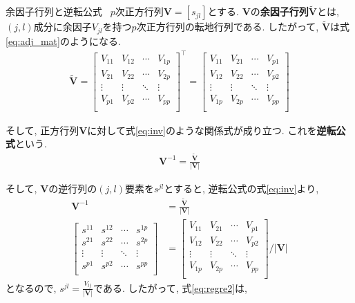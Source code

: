 \begin{itembox}[l]{余因子行列と逆転公式}
  \ $p$次正方行列$\bm{V}=[s_{jl}]$とする. $\bm{V}$の{\bf 余因子行列}$\tilde{\bm{V}}$とは, $(j, l)$成分に余因子$V_{jl}$を持つ$p$次正方行列の転地行列である. したがって, $\tilde{\bm{V}}$は式\eqref{eq:adj_mat}のようになる. 
  \begin{align}
    \label{eq:adj_mat}
    \tilde{\bm{V}} =
    \left[
      \begin{array}{cccc}
        V_{11} &V_{12} &\cdots &V_{1p} \\
        V_{21} &V_{22} &\cdots &V_{2p}\\
        \vdots &\vdots &\ddots &\vdots\\
        V_{p1} &V_{p2} &\cdots &V_{pp} \\
      \end{array}
    \right]^\top
    = 
    \left[
      \begin{array}{cccc}
        V_{11} &V_{21} &\cdots &V_{p1} \\
        V_{12} &V_{22} &\cdots &V_{p2}\\
        \vdots &\vdots &\ddots &\vdots\\
        V_{1p} &V_{2p} &\cdots &V_{pp} \\
      \end{array}
    \right]
  \end{align}

そして, 正方行列$\bm{V}$に対して式\eqref{eq:inv}のような関係式が成り立つ. これを{\bf 逆転公式}という. 
  \begin{align}
    \label{eq:inv}
    \bm{V}^{-1} = \frac{\tilde{\bm{{V}}}}{|\bm{V}|}
  \end{align}
\end{itembox}
そして, $\bm{V}$の逆行列の$(j, l)$要素を$s^{jl}$とすると, 逆転公式の式\eqref{eq:inv}より, 
\begin{align*}
  \bm{V}^{-1}
  &=  \frac{\tilde{\bm{{V}}}}{|\bm{V}|}\\
  \left[
    \begin{array}{cccc}
      s^{11} &s^{12} &\cdots &s^{1p}\\
      s^{21} &s^{22} &\cdots &s^{2p} \\
      \vdots &\vdots &\ddots &\vdots \\
      s^{p1} &s^{p2} &\cdots &s^{pp}\\
    \end{array}
  \right]
  &=
  \left[
    \begin{array}{cccc}
      V_{11} &V_{21} &\cdots &V_{p1} \\
      V_{12} &V_{22} &\cdots &V_{p2}\\
      \vdots &\vdots &\ddots &\vdots\\
      V_{1p} &V_{2p} &\cdots &V_{pp} \\
    \end{array}
  \right]
  / |\bm{V}|
\end{align*}
となるので, $s^{jl}=\frac{V_{lj}}{|\bm{V}|}$である. したがって, 式\eqref{eq:regre2}は, 

